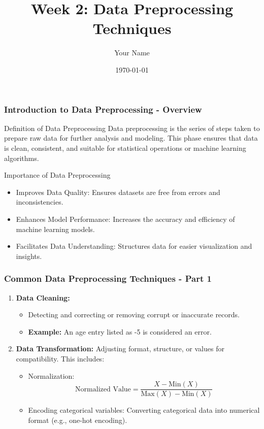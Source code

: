 \documentclass{beamer}
\title{Week 2: Data Preprocessing Techniques}
\author{Your Name}
\institute{Your Institution}
\date{\today}
\begin{document}
\frame{\titlepage}

\begin{frame}[fragile]
    \frametitle{Introduction to Data Preprocessing - Overview}
    \begin{block}{Definition of Data Preprocessing}
        Data preprocessing is the series of steps taken to prepare raw data for further analysis and modeling. This phase ensures that data is clean, consistent, and suitable for statistical operations or machine learning algorithms.
    \end{block}

    \begin{block}{Importance of Data Preprocessing}
        \begin{itemize}
            \item Improves Data Quality: Ensures datasets are free from errors and inconsistencies.
            \item Enhances Model Performance: Increases the accuracy and efficiency of machine learning models.
            \item Facilitates Data Understanding: Structures data for easier visualization and insights.
        \end{itemize}
    \end{block}
\end{frame}

\begin{frame}[fragile]
    \frametitle{Common Data Preprocessing Techniques - Part 1}
    \begin{enumerate}
        \item \textbf{Data Cleaning:}
            \begin{itemize}
                \item Detecting and correcting or removing corrupt or inaccurate records.
                \item \textbf{Example:} An age entry listed as -5 is considered an error.
            \end{itemize}
        
        \item \textbf{Data Transformation:} 
            Adjusting format, structure, or values for compatibility. This includes:
            \begin{itemize}
                \item Normalization:
                \begin{equation}
                \text{Normalized Value} = \frac{X - \text{Min}(X)}{\text{Max}(X) - \text{Min}(X)}
                \end{equation}
                \item Encoding categorical variables: Converting categorical data into numerical format (e.g., one-hot encoding).
            \end{itemize}
    \end{enumerate}
\end{frame}
\end{document}
